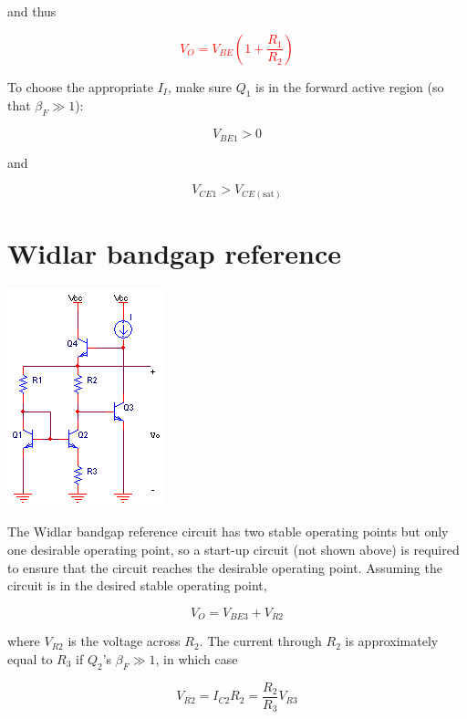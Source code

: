 and thus

\textcolor{red}{
\begin{equation}
V_{O} = V_{BE}\left(1+\frac{R_1}{R_2}\right)
\label{eq:vbe_multiplier_Vo}
\end{equation}
}

To choose the appropriate $I_{I}$, make sure $Q_1$ is in the forward active region (so that $\beta_{F} \gg 1$):

\begin{equation}
V_{BE1} > 0
\end{equation}

and

\begin{equation}
V_{CE1} > V_{CE(\text{sat})}
\end{equation}

\section{Widlar bandgap reference}
\begin{center}
	\includegraphics{schematics/Widlar_bandgap.PNG}
\end{center}
The Widlar bandgap reference circuit has two stable operating points but only one desirable operating point, so a start-up circuit (not shown above) is required to ensure that the circuit reaches the desirable operating point.
Assuming the circuit is in the desired stable operating point,

\begin{equation}
V_{O} = V_{BE3} + V_{R2}
\label{eq:Widlar_bandgap_Vo_basic}
\end{equation}

where $V_{R2}$ is the voltage across $R_2$.
The current through $R_2$ is approximately equal to $R_3$ if $Q_2$'s $\beta_{F} \gg 1$, in which case

\begin{equation}
V_{R2} = I_{C2}R_2 = \frac{R_2}{R_3}V_{R3}
\label{eq:Widlar_bandgap_Vr2_wrt_Vr3}
\end{equation}

